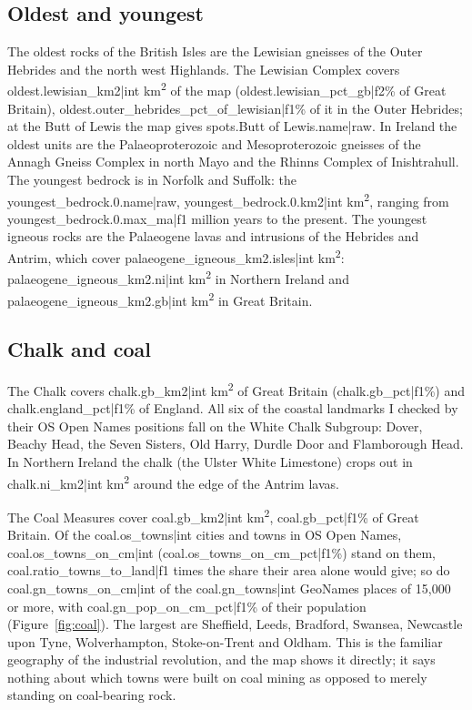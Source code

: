 \documentclass[11pt,a4paper]{article}
\begin{document}
\subsection{Oldest and youngest}

The oldest rocks of the British Isles are the Lewisian gneisses of the Outer Hebrides and the north west Highlands. The Lewisian Complex covers {{oldest.lewisian_km2|int}} km\textsuperscript{2} of the map ({{oldest.lewisian_pct_gb|f2}}\% of Great Britain), {{oldest.outer_hebrides_pct_of_lewisian|f1}}\% of it in the Outer Hebrides; at the Butt of Lewis the map gives {{spots.Butt of Lewis.name|raw}}. In Ireland the oldest units are the Palaeoproterozoic and Mesoproterozoic gneisses of the Annagh Gneiss Complex in north Mayo and the Rhinns Complex of Inishtrahull. The youngest bedrock is in Norfolk and Suffolk: the {{youngest_bedrock.0.name|raw}}, {{youngest_bedrock.0.km2|int}} km\textsuperscript{2}, ranging from {{youngest_bedrock.0.max_ma|f1}} million years to the present. The youngest igneous rocks are the Palaeogene lavas and intrusions of the Hebrides and Antrim, which cover {{palaeogene_igneous_km2.isles|int}} km\textsuperscript{2}: {{palaeogene_igneous_km2.ni|int}} km\textsuperscript{2} in Northern Ireland and {{palaeogene_igneous_km2.gb|int}} km\textsuperscript{2} in Great Britain.

\subsection{Chalk and coal}

The Chalk covers {{chalk.gb_km2|int}} km\textsuperscript{2} of Great Britain ({{chalk.gb_pct|f1}}\%) and {{chalk.england_pct|f1}}\% of England. All six of the coastal landmarks I checked by their OS Open Names positions fall on the White Chalk Subgroup: Dover, Beachy Head, the Seven Sisters, Old Harry, Durdle Door and Flamborough Head. In Northern Ireland the chalk (the Ulster White Limestone) crops out in {{chalk.ni_km2|int}} km\textsuperscript{2} around the edge of the Antrim lavas.

The Coal Measures cover {{coal.gb_km2|int}} km\textsuperscript{2}, {{coal.gb_pct|f1}}\% of Great Britain. Of the {{coal.os_towns|int}} cities and towns in OS Open Names, {{coal.os_towns_on_cm|int}} ({{coal.os_towns_on_cm_pct|f1}}\%) stand on them, {{coal.ratio_towns_to_land|f1}} times the share their area alone would give; so do {{coal.gn_towns_on_cm|int}} of the {{coal.gn_towns|int}} GeoNames places of 15,000 or more, with {{coal.gn_pop_on_cm_pct|f1}}\% of their population (Figure~\ref{fig:coal}). The largest are Sheffield, Leeds, Bradford, Swansea, Newcastle upon Tyne, Wolverhampton, Stoke-on-Trent and Oldham. This is the familiar geography of the industrial revolution, and the map shows it directly; it says nothing about which towns were built on coal mining as opposed to merely standing on coal-bearing rock.
\end{document}
